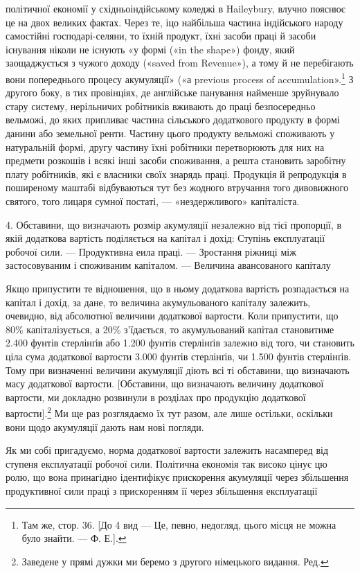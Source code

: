 політичної економії у східньоіндійському коледжі в Haileybury,
влучно пояснює це на двох великих фактах. Через те, іцо
найбільша частина індійського народу самостійні господарі-селяни,
то їхній продукт, їхні засоби праці й засоби існування
ніколи не існують «у формі («in the shape») фонду, який заощаджується
з чужого доходу («saved from Revenue»), а тому
й не перебігають вони попереднього процесу акумуляції» («а
previous process of accumulation».\footnote{
Там же, стор. 36. [До 4 вид — Це, певно, недогляд, цього місця
не можна було знайти. — Ф. Е.].
} З другого боку, в тих провінціях,
де англійське панування найменше зруйнувало стару
систему, нерільничих робітників вживають до праці безпосередньо
вельможі, до яких припливає частина сільського додаткового продукту
в формі данини або земельної ренти. Частину цього продукту
вельможі споживають у натуральній формі, другу частину
їхні робітники перетворюють для них на предмети розкошів
і всякі інші засоби споживання, а решта становить заробітну
плату робітників, які є власники своїх знарядь праці. Продукція
й репродукція в поширеному маштабі відбуваються тут без
жодного втручання того дивовижного святого, того лицаря сумної
постаті, — «нездержливого» капіталіста.

4. Обставини, що визначають розмір акумуляції незалежно від
тієї пропорції, в якій додаткова вартість поділяється на капітал
і дохід: Ступінь експлуатації робочої сили. — Продуктивна
еила праці. — Зростання ріжниці між застосовуваним і споживаним
капіталом. — Величина авансованого капіталу

Якщо припустити те відношення, що в ньому додаткова вартість
розпадається на капітал і дохід, за дане, то величина акумульованого
капіталу залежить, очевидно, від абсолютної величини
додаткової вартости. Коли припустити, що 80\% капіталізується,
а 20\% з’їдається, то акумульований капітал становитиме
2.400 фунтів стерлінґів або 1.200 фунтів стерлінґів залежно
від того, чи становить ціла сума додаткової вартости 3.000 фунтів
стерлінґів, чи 1.500 фунтів стерлінґів. Тому при визначенні
величини акумуляції діють всі ті обставини, що визначають масу
додаткової вартости. [Обставини, що визначають величину додаткової
вартости, ми докладно розвинули в розділах про продукцію
додаткової вартости].\footnote*{
Заведене у прямі дужки ми беремо з другого німецького видання.
Ред.
} Ми ще раз розглядаємо їх тут
разом, але лише остільки, оскільки вони щодо акумуляції дають
нам нові погляди.

Як ми собі пригадуємо, норма додаткової вартости залежить
насамперед від ступеня експлуатації робочої сили. Політична
економія так високо цінує цю ролю, що вона принагідно ідентифікує
прискорення акумуляції через збільшення продуктивної
сили праці з прискоренням її через збільшення експлуатації